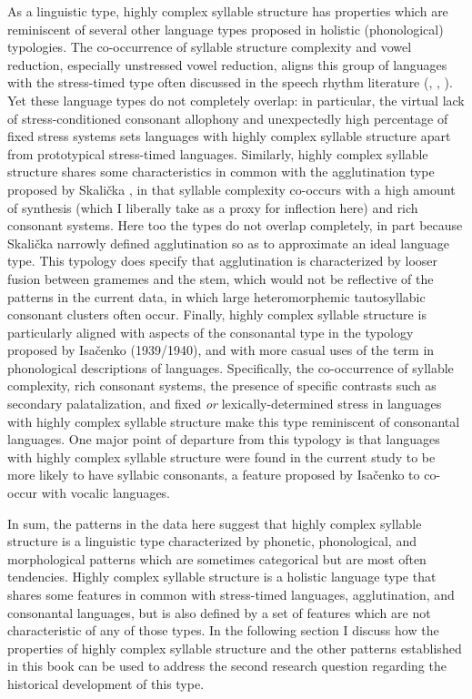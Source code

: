   As a linguistic type, highly complex syllable structure has properties which are reminiscent of several other language types proposed in holistic (phonological) typologies. The co-occurrence of syllable structure complexity and vowel reduction, especially unstressed vowel reduction, aligns this group of languages with the stress-timed type often discussed in the speech rhythm literature (\citealt{Dauer1983}, \citealt{Auer1993}, \citealt{Schiering2007}). Yet these language types do not completely overlap: in particular, the virtual lack of stress-conditioned consonant allophony and unexpectedly high percentage of fixed stress systems sets languages with highly complex syllable structure apart from prototypical stress-timed languages. Similarly, highly complex syllable structure shares some characteristics in common with the agglutination type proposed by Skalička , in that syllable complexity co-occurs with a high amount of synthesis (which I liberally take as a proxy for inflection here) and rich consonant systems. Here too the types do not overlap completely, in part because Skalička narrowly defined agglutination so as to approximate an ideal language type. This typology does specify that agglutination is characterized by looser fusion between gramemes and the stem, which would not be reflective of the patterns in the current data, in which large heteromorphemic tautosyllabic consonant clusters often occur. Finally, highly complex syllable structure is particularly aligned with aspects of the consonantal type in the typology proposed by Isačenko (1939/1940), and with more casual uses of the term in phonological descriptions of languages. Specifically, the co-occurrence of syllable complexity, rich consonant systems, the presence of specific contrasts such as secondary palatalization, and fixed \textit{or} lexically-determined stress in languages with highly complex syllable structure make this type reminiscent of consonantal languages. One major point of departure from this typology is that languages with highly complex syllable structure were found in the current study to be more likely to have syllabic consonants, a feature proposed by Isačenko to co-occur with vocalic languages.

  In sum, the patterns in the data here suggest that highly complex syllable structure is a linguistic type characterized by phonetic, phonological, and morphological patterns which are sometimes categorical but are most often tendencies. Highly complex syllable structure is a holistic language type that shares some features in common with stress-timed languages, agglutination, and consonantal languages, but is also defined by a set of features which are not characteristic of any of those types. In the following section I discuss how the properties of highly complex syllable structure and the other patterns established in this book can be used to address the second research question regarding the historical development of this type.

